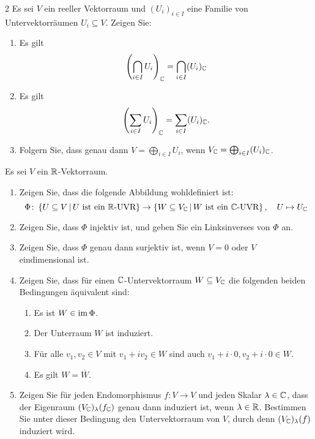 \begin{question}[subtitle = Komplexifizierung von Summen Schnitten und direkten Summen]{2}
  \label{qst: compatibility of sums and intersections with complexification}
  Es sei $V$ ein reeller Vektorraum und $(U_i)_{i \in I}$ eine Familie von Untervektorräumen $U_i \subseteq V$.
  Zeigen Sie:
  \begin{enumerate}[leftmargin=*]
    \item
      Es gilt
      \[
            \left( \bigcap_{i \in I} U_i \right)_{\mathbb{C}}
        = \bigcap_{i \in I} (U_i)_{\mathbb{C}}
      \]
    \item
      Es gilt
      \[
          \left( \sum_{i \in I} U_i \right)_{\mathbb{C}}
        = \sum_{i \in I} (U_i)_{\mathbb{C}}.
      \]
    \item
      Folgern Sie, dass genau dann $V = \bigoplus_{i \in I} U_i$, wenn $V_{\mathbb{C}} = \bigoplus_{i \in I} (U_i)_{\mathbb{C}}$.
  \end{enumerate}
\end{question}


\begin{question}[subtitle = Induzierte Untervektorräume]{2}
  Es sei $V$ ein $\mathbb{R}$-Vektorraum.
  \begin{enumerate}[leftmargin=*]
    \item
      Zeigen Sie, dass die folgende Abbildung wohldefiniert ist:
      \[
        \Phi
        \colon
        \left\{
          U \subseteq V
        \,\middle|\,
          \text{$U$ ist ein $\mathbb{R}$-UVR}
        \right\}
        \to
        \left\{
          W \subseteq V_{\mathbb{C}}
         \,\middle|\,
          \text{$W$ ist ein $\mathbb{C}$-UVR}
        \right\},
        \quad
        U \mapsto U_{\mathbb{C}}
      \]
    \item
      Zeigen Sie, dass $\Phi$ injektiv ist, und geben Sie ein Linksinverses von $\Phi$ an.
    \item
      Zeigen Sie, dass $\Phi$ genau dann surjektiv ist, wenn $V = 0$ oder $V$ eindimensional ist.
    \item
      Zeigen Sie, dass für einen $\mathbb{C}$-Untervektorraum $W \subseteq V_{\mathbb{C}}$ die folgenden beiden Bedingungen äquivalent sind:
      \begin{enumerate}
        \item
          Es ist $W \in \operatorname{im} \Phi$.
        \item
          Der Unterraum $W$ ist induziert.
        \item
          Für alle $v_1, v_2 \in V$ mit $v_1 + i v_2 \in W$ sind auch $v_1 + i \cdot 0, v_2 + i \cdot 0 \in W$.
        \item
          Es gilt $W = \overline{W}$.
      \end{enumerate}
    \item
      Zeigen Sie für jeden Endomorphismus $f \colon V \to V$ und jeden Skalar $\lambda \in \mathbb{C}$, dass der Eigenraum $(V_{\mathbb{C}})_\lambda(f_{\mathbb{C}})$ genau dann induziert ist, wenn $\lambda \in \mathbb{R}$.
      Bestimmen Sie unter dieser Bedingung den Untervektorraum von $V$, durch denn $(V_{\mathbb{C}})_\lambda(f)$ induziert wird.
  \end{enumerate}
\end{question}


